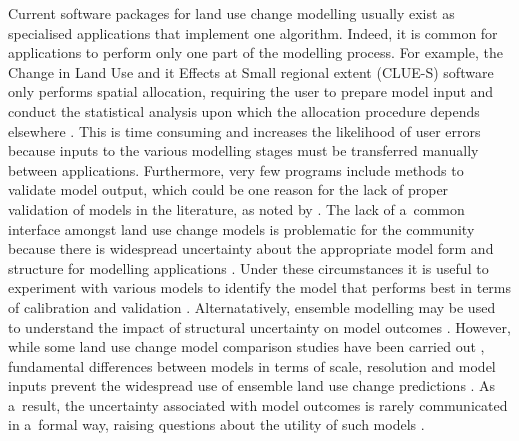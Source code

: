 \documentclass[gmdd, online, hvmath]{copernicus}
\begin{document}
Current software packages for land use change modelling usually exist as specialised applications that implement one algorithm. Indeed, it is common for applications to perform only one part of the modelling process. For example, the Change in Land Use and it Effects at Small regional extent (CLUE-S) software only performs spatial allocation, requiring the user to prepare model input and conduct the statistical analysis upon which the allocation procedure depends elsewhere \citep{verburg2002}. This is time consuming and increases the likelihood of user errors because inputs to the various modelling stages must be transferred manually between applications. Furthermore, very few programs include methods to validate model output, which could be one reason for the lack of proper validation of models in the literature, as noted by \citet{rosa2014}. The lack of a~common interface amongst land use change models is problematic for the community because there is widespread uncertainty about the appropriate model form and structure for modelling applications \citep{verburg2013}. Under these circumstances it is useful to experiment with various models to identify the model that performs best in terms of calibration and validation \citep{schmitz2009}. Alternatatively, ensemble modelling may be used to understand the impact of structural uncertainty on model outcomes \citep{knutti2012}. However, while some land use change model comparison studies have been carried out \citep[e.g][]{perez-vega2012,mas2014,rosa2014}, fundamental differences between models in terms of scale, resolution and model inputs prevent the widespread use of ensemble land use change predictions \citep{rosa2014}. As a~result, the uncertainty associated with model outcomes is rarely communicated in a~formal way, raising questions about the utility of such models \citep{pontius2005-a}. \\
\end{document}
